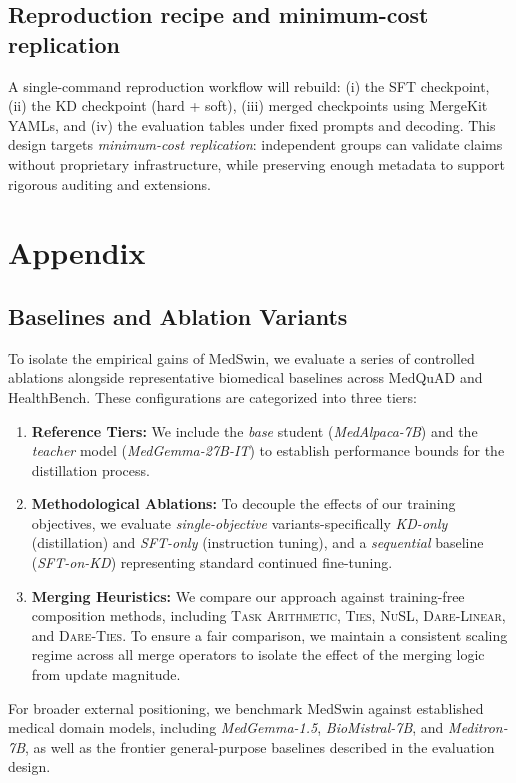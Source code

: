 \documentclass[conference]{IEEEtran}
\begin{document}
\subsection{Reproduction recipe and minimum-cost replication}
A single-command reproduction workflow will rebuild: (i) the SFT checkpoint, (ii) the KD checkpoint (hard + soft), (iii) merged checkpoints using MergeKit YAMLs, and (iv) the evaluation tables under fixed prompts and decoding. This design targets \emph{minimum-cost replication}: independent groups can validate claims without proprietary infrastructure, while preserving enough metadata to support rigorous auditing and extensions.


\section{Appendix}
\label{sec:appendix}

\subsection{Baselines and Ablation Variants}
To isolate the empirical gains of MedSwin, we evaluate a series of controlled ablations alongside representative biomedical baselines across MedQuAD and HealthBench. These configurations are categorized into three tiers:

\begin{enumerate}
    \item \textbf{Reference Tiers:} We include the \emph{base} student (\textit{MedAlpaca-7B}) and the \emph{teacher} model (\textit{MedGemma-27B-IT}) to establish performance bounds for the distillation process.
    \item \textbf{Methodological Ablations:} To decouple the effects of our training objectives, we evaluate \emph{single-objective} variants-specifically \emph{KD-only} (distillation) and \emph{SFT-only} (instruction tuning), and a \emph{sequential} baseline (\emph{SFT-on-KD}) representing standard continued fine-tuning.
    \item \textbf{Merging Heuristics:} We compare our approach against training-free composition methods, including \textsc{Task Arithmetic}, \textsc{Ties}, \textsc{NuSL}, \textsc{Dare-Linear}, and \textsc{Dare-Ties}. To ensure a fair comparison, we maintain a consistent scaling regime across all merge operators to isolate the effect of the merging logic from update magnitude.
\end{enumerate}

For broader external positioning, we benchmark MedSwin against established medical domain models, including \textit{MedGemma-1.5}, \textit{BioMistral-7B}, and \textit{Meditron-7B}, as well as the frontier general-purpose baselines described in the evaluation design.
\end{document}
